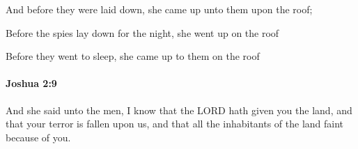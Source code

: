 			\begin{versebox}
					\item[BHS] 
					\item[ASV] And before they were laid down, she came up unto them upon the roof;
					\item[NIV] Before the spies lay down for the night, she went up on the roof
					\item[NRSV] Before they went to sleep, she came up to them on the roof
			\end{versebox}

		\paragraph{Joshua 2:9} %
			\label{JOSHUA-2-9}

			And she said unto the men, I know that the LORD hath given you the land, and that your terror is fallen upon us, and that all the inhabitants of the land faint because of you.

